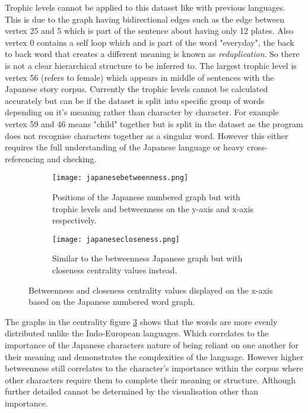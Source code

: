 Trophic levels cannot be applied to this dataset like with previous languages. This is due to the graph having bidirectional edges such as the edge between vertex 25 and 5 which is part of the sentence about having only 12 plates. Also vertex 0 contains a self loop which and is part of the word "everyday", the back to back word that creates a different meaning is known as \emph{reduplication}. So there is not a clear hierarchical structure to be inferred to. The largest trophic level is vertex 56 (refers to female) which appears in middle of sentences with the Japanese story corpus. Currently the trophic levels cannot be calculated accurately but can be if the dataset is split into specific group of words depending on it's meaning rather than character by character. For example vertex 59 and 46 means "child" together but is split in the dataset as the program does not recognise characters together as a singular word. However this either requires the full understanding of the Japanese language or heavy cross-referencing and checking. 

\begin{figure}[H]
\centering
\begin{subfigure}{.45\textwidth}
	\hspace{-1cm} 
	\texttt{[image: japanesebetweenness.png]}
	\caption{Positions of the Japanese numbered graph but with trophic levels and betweenness on the y-axis and x-axis respectively.}
	\label{fig:jpbc}
\end{subfigure}
\hfill
\begin{subfigure}{.45\textwidth}
	\hspace{-1cm} 
	\texttt{[image: japanesecloseness.png]}
	\caption{Similar to the betweenness Japanese graph but with closeness centrality values instead. }
	\label{fig:jpcc}
\end{subfigure}
\caption{Betweenness and closeness centrality values displayed on the x-axis based on the Japanese numbered word graph.}
\label{fig:jpcentrality}
\end{figure}

The graphs in the centrality figure \ref{fig:jpcentrality} shows that the words are more evenly distributed unlike the Indo-European languages. Which correlates to the importance of the Japanese characters nature of being reliant on one another for their meaning and demonstrates the complexities of the language. However higher betweenness still correlates to the character's importance within the corpus where other characters require them to complete their meaning or structure. Although further detailed cannot be determined by the visualisation other than importance.


